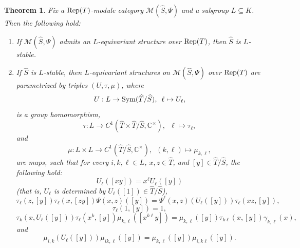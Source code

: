 \documentclass{amsart}
\newtheorem{theorem}{Theorem}[section]
\theoremstyle{definition}
\newcommand{\Rep}{{\rm Rep}}
\newcommand{\M}{\mathscr{M}}
\numberwithin{equation}{section}
\begin{document}
\begin{theorem}\label{partaunew}
Fix a $\Rep(T)$-module category $\M(\widehat{S},\Psi)$ and a subgroup $L\subseteq K$. 
Then the following hold:
\begin{enumerate}
\item
If $\M(\widehat{S},\Psi)$ admits an $L$-equivariant structure over $\Rep(T)$, then $\widehat{S}$ is $L$-stable.
\item
If $\widehat{S}$ is $L$-stable, then 
$L$-equivariant structures on $\M(\widehat{S},\Psi)$ over $\Rep(T)$ are parametrized by triples $(U,\tau,\mu)$, where 
\begin{equation}\label{Ul0}
U:L\to {\rm Sym}(\widehat{T}/\widehat{S}),\,\,\,\ell\mapsto U_{\ell},
\end{equation}
is a group homomorphism, 
\begin{equation}\label{taufirstt}
\tau: L\to C^1(\widehat{T}\times \widehat{T}/\widehat{S},\mathbb{C}^{\times}),\,\,\,\ell\mapsto \tau_{\ell},
\end{equation}
and
\begin{equation}\label{mufirstt0}
\mu: L\times L\to C^1(\widehat{T}/\widehat{S},\mathbb{C}^{\times}),\,\,\,(k,\ell)\mapsto \mu_{k,\ell},
\end{equation}
are maps, such that for every $i,k,\ell\in L$, $x,z\in \widehat{T}$, and $[y]\in \widehat{T}/\widehat{S}$, the following hold:
\begin{equation}\label{Ul}
U_{\ell}([xy])=x^{\ell}U_{\ell}([y])
\end{equation}
(that is, $U_{\ell}$ is determined by $U_{\ell}([1])\in \widehat{T}/\widehat{S}$),
\begin{equation}\label{taulPsi}
\tau_{\ell}(z,[y])\tau_{\ell}(x,[zy])\Psi(x,z)([y])= \Psi^{\ell}(x,z)(U_{\ell}([y]))\tau_{\ell}(xz,[y]),
\end{equation}
\begin{equation}\label{taul1yS}
\tau_{\ell}(1,[y])=1,
\end{equation}
\begin{equation}\label{Ultaul}
\tau_k(x,U_{\ell}([y]))\tau_{\ell}(x^k,[y])\mu_{k,\ell}([x^{k\ell}y])=\mu_{k,\ell}([y])\tau_{k\ell}(x,[y])\gamma_{k,\ell}(x),
\end{equation}
and 
\begin{equation}\label{mufirstt}
\mu_{i,k}(U_{\ell}([y]))\mu_{ik,\ell}([y])=\mu_{k,\ell}([y])\mu_{i,k\ell}([y]).
\end{equation}
\end{enumerate}
\end{theorem}
\end{document}
